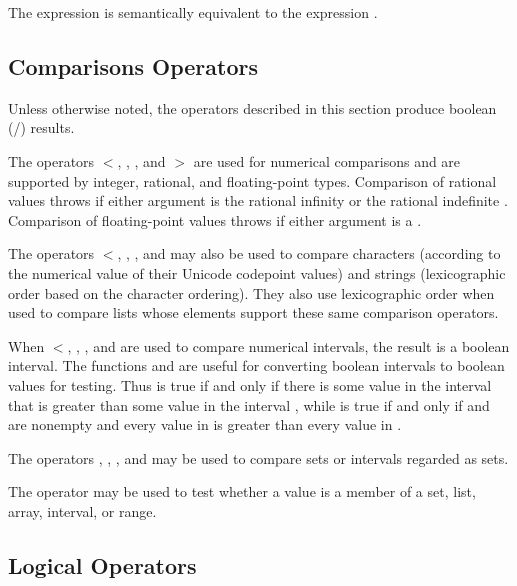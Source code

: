 The expression  is semantically equivalent to the expression
.


\subsection{Comparisons Operators}

Unless otherwise noted, the operators described in this section
produce boolean (/) results.

The operators $<$, \EXP{\leq}, \EXP{\geq}, and $>$ are
  used for numerical comparisons
and are supported by integer, rational, and floating-point types.
Comparison of rational values throws 
if either argument is the rational infinity  or the
rational indefinite .
Comparison of floating-point values throws 
if either argument is a .

The operators $<$, \EXP{\leq}, \EXP{\geq}, and \EXP{>} may also be
used to compare characters
(according to the numerical value of their Unicode codepoint values)
and strings (lexicographic order based on the character ordering).
They also use lexicographic order when used to compare lists
whose elements support these same comparison operators.

When $<$, \EXP{\leq}, \EXP{\geq}, and \EXP{>} are used to compare numerical
intervals, the result is a boolean interval.  The functions
 and  are useful for converting
boolean intervals to boolean values for testing.  Thus
 is true if and only if there is some value in the interval
 that is greater than some value in the interval , while
 is true if and only if  and  are nonempty
and every value in  is greater than every value in .

The operators \EXP{\subset}, \EXP{\subseteq}, \EXP{\supseteq}, and
\EXP{\supset} may be used to compare sets or intervals regarded as sets.

The operator \EXP{\in} may be used to test whether a value is a member of
a set, list, array, interval, or range.

\subsection{Logical Operators}

